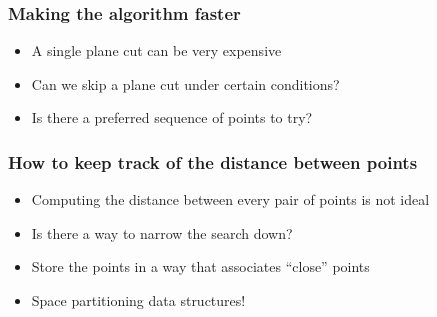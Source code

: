 \documentclass{beamer}
\begin{document}
\begin{frame}
\begin{center}
  \end{center}
\end{frame}

\begin{frame}
  \frametitle{Making the algorithm faster}
  \begin{itemize}[<+->]
  \item A single plane cut can be very expensive
    \vspace{\baselineskip}
  \item Can we skip a plane cut under certain conditions?
    \vspace{\baselineskip}
  \item Is there a preferred sequence of points to try?
  \end{itemize}
\end{frame}

\begin{frame}
  \frametitle{How to keep track of the distance between points}
  \begin{itemize}[<+->]
  \item Computing the distance between every pair of points is not ideal
    \vspace{\baselineskip}
  \item Is there a way to narrow the search down?
    \vspace{\baselineskip}
  \item Store the points in a way that associates ``close'' points
    \vspace{\baselineskip}
  \item Space partitioning data structures!
  \end{itemize}
\end{frame}
\end{document}
